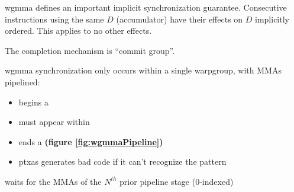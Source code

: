 \filbreak
{}
wgmma defines an important implicit synchronization guarantee.
Consecutive  instructions using the same $D$ (accumulator) have their effects on $D$ implicitly ordered.
This applies to no other effects.

\filbreak
{}
The completion mechanism is ``commit group''.

\filbreak
wgmma synchronization only occurs within a single warpgroup, with MMAs pipelined:

\begin{itemize}
\item {} begins a 
\item {} must appear within 
\item {} ends a  \textbf{(figure \ref{fig:wgmmaPipeline})}
\item ptxas generates bad code if it can't recognize the pattern
\end{itemize}
 waits for the MMAs of the $N^{th}$ prior pipeline stage (0-indexed)

\filbreak
{}

\filbreak
{}


